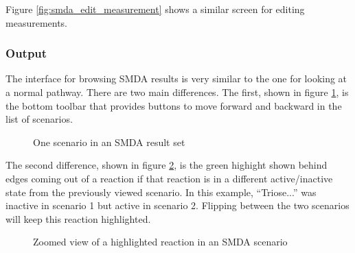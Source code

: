 Figure \ref{fig:smda_edit_measurement} shows a similar screen for editing
measurements.

\subsubsection{Output}
\label{sect:smda_interface_output}

The interface for browsing SMDA results is very similar to the one for looking
at a normal pathway. There are two main differences. The first, shown in figure
\ref{fig:smda_results}, is the bottom toolbar that provides buttons to move
forward and backward in the list of scenarios.

\begin{figure}[htb]
    \caption{\label{fig:smda_results} One scenario in an SMDA result set}
\end{figure}

The second difference, shown in figure \ref{fig:smda_results_highlight}, is the
green highight shown behind edges coming out of a reaction if that reaction is
in a different active/inactive state from the previously viewed scenario. In
this example, ``Triose...'' was inactive in scenario 1 but active in scenario 2.
Flipping between the two scenarios will keep this reaction highlighted.

\begin{figure}[htb]
    \caption{\label{fig:smda_results_highlight} Zoomed view of a highlighted
    reaction in an SMDA scenario}
\end{figure}
